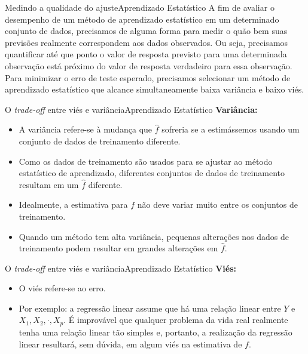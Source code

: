 \documentclass[t]{beamer}
\begin{document}

\begin{ftst}{Medindo a qualidade do ajuste}{{Aprendizado Estatístico}}
\justifying
A fim de avaliar o desempenho de um método de aprendizado estatístico em um determinado conjunto de dados, precisamos de alguma forma para medir o quão bem suas previsões realmente correspondem aos dados observados.
\vone
Ou seja, precisamos quantificar até que ponto o valor de resposta previsto para uma determinada observação está próximo do valor de resposta verdadeiro para essa observação.
\vone
Para minimizar o erro de teste esperado, precisamos selecionar um método de aprendizado estatístico que alcance simultaneamente baixa variância e baixo viés.
\end{ftst}


\begin{ftst}{O \textit{trade-off} entre viés e variância}{{Aprendizado Estatístico}}
\justifying
\textbf{Variância:}
\begin{itemize}
    \item A variância refere-se à mudança que $\hat{f}$ sofreria se a estimássemos usando um conjunto de dados de treinamento diferente. 
    \item Como os dados de treinamento são usados para se ajustar ao método estatístico de aprendizado, diferentes conjuntos de dados de treinamento resultam em um $\hat{f}$ diferente. 
    \item Idealmente, a estimativa para $f$ não deve variar muito entre os conjuntos de treinamento. 
    \item Quando um método tem alta variância, pequenas alterações nos dados de treinamento podem resultar em grandes alterações em $\hat{f}$.

\end{itemize}
\end{ftst}


\begin{ftst}{O \textit{trade-off} entre viés e variância}{{Aprendizado Estatístico}}
\justifying
\textbf{Viés:}
\begin{itemize}
    \item O viés refere-se ao erro.
    \item Por exemplo: a regressão linear assume que há uma relação linear entre $Y$ e $X_1, X_2, \cdot, X_p$. É improvável que qualquer problema da vida real realmente tenha uma relação linear tão simples e, portanto, a realização da regressão linear resultará, sem dúvida, em algum viés na estimativa de $f$.
\end{itemize}
\end{ftst}
\end{document}
